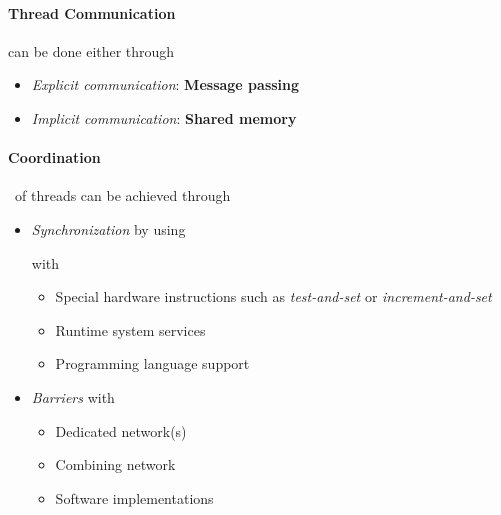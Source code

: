 \paragraph{Thread Communication} can be done either through
\begin{itemize}
	\item \emph{Explicit communication}: {\bf Message passing}

	\item \emph{Implicit communication}: {\bf Shared memory}
\end{itemize}


\paragraph{Coordination} of threads can be achieved through
\begin{itemize}
	\item \emph{Synchronization} by using
		with
		\begin{itemize}
			\item Special hardware instructions such as \emph{test-and-set} or \emph{increment-and-set}
			\item Runtime system services
			\item Programming language support
		\end{itemize}

	\item \emph{Barriers} with
		\begin{itemize}
			\item Dedicated network(s)
			\item Combining network
			\item Software implementations
		\end{itemize}

\end{itemize}
